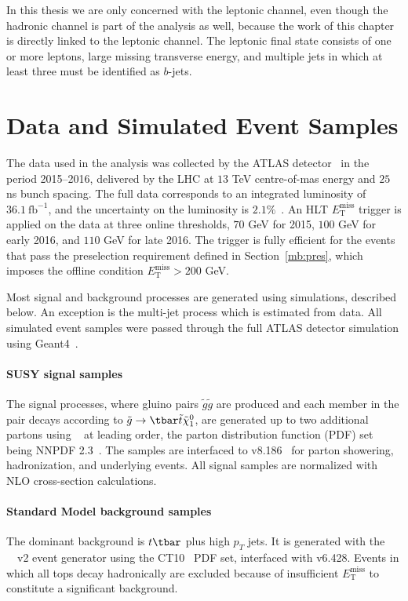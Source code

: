 In this thesis we are only concerned with the leptonic channel, even though the
hadronic channel is part of the analysis as well, because the work of this
chapter is directly linked to the leptonic channel. The leptonic final state
consists of one or more leptons, large missing transverse energy, and multiple
jets in which at least three must be identified as $b$-jets.

\section{Data and Simulated Event Samples}\label{mbdatasm}

The data used in the analysis was collected by the ATLAS
detector~\cite{PERF-2007-01} in the period 2015--2016, delivered by the LHC at
$13$ TeV centre-of-mas energy and $25$ ns bunch spacing. The full data
corresponds to an integrated luminosity of $36.1~\text{fb}^{-1}$, and the
uncertainty on the luminosity is $2.1\%$~\cite{DAPR-2013-01}. An HLT
$E_{\text{T}}^{\text{miss}}$ trigger is applied on the data at three online
thresholds, $70$ GeV for 2015, $100$ GeV for early 2016, and $110$ GeV for late
2016. The trigger is fully efficient for the events that pass the preselection
requirement defined in Section~\ref{mb:pres}, which imposes the offline
condition $E_{\text{T}}^{\text{miss}} > 200$ GeV.

Most signal and background processes are generated using simulations, described
below. An exception is the multi-jet process which is estimated from data. All
simulated event samples were passed through the full ATLAS detector simulation
using Geant4~\cite{Agostinelli:2002hh}.

\paragraph{SUSY signal samples} The signal processes, where gluino pairs
$\tilde{g}\tilde{g}$ are produced and each member in the pair decays according
to $\tilde{g}\to \tbar\tilde{t}\tilde{\chi}^0_1$, are generated up to two
additional partons using \MGMCatNLO~\cite{Alwall:2014hca} at leading order, the
parton distribution function (PDF) set being NNPDF 2.3~\cite{Ball:2012cx}. The
samples are interfaced to \PYTHIA v8.186~\cite{Sjostrand:2007gs} for parton
showering, hadronization, and underlying events. All signal samples are
normalized with NLO cross-section calculations.


\paragraph{Standard Model background samples} The dominant background is
$t\tbar$ plus high $p_T$ jets. It is generated with the
\POWHEGBOX~\cite{Alioli:2010xd}~v2 event generator using the
CT10~\cite{Lai:2010vv} PDF set, interfaced with \PYTHIA v6.428. Events in which
all tops decay hadronically are excluded because of insufficient
$E_{\text{T}}^{\text{miss}}$ to constitute a significant background.

